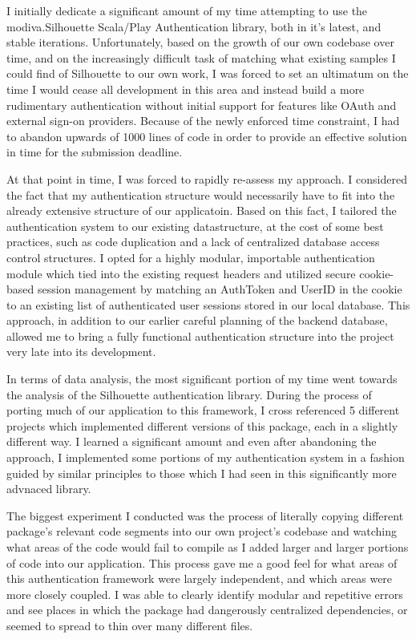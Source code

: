 \documentclass{article}
\begin{document}
    I initially dedicate a significant amount of my time attempting to use the modiva.Silhouette Scala/Play Authentication library, both in it's latest, and stable iterations. Unfortunately, based on the growth of our own codebase over time, and on the increasingly difficult task of matching what existing samples I could find of Silhouette to our own work, I was forced to set an ultimatum on the time I would cease all development in this area and instead build a more rudimentary authentication without initial support for features like OAuth and external sign-on providers. Because of the newly enforced time constraint, I had to abandon upwards of 1000 lines of code in order to provide an effective solution in time for the submission deadline.

    At that point in time, I was forced to rapidly re-assess my approach. I considered the fact that my authentication structure would necessarily have to fit into the already extensive structure of our applicatoin. Based on this fact, I tailored the authentication system to our existing datastructure, at the cost of some best practices, such as code duplication and a lack of centralized database access control structures. I opted for a highly modular, importable authentication module which tied into the existing request headers and utilized secure cookie-based session management by matching an AuthToken and UserID in the cookie to an existing list of authenticated user sessions stored in our local database. This approach, in addition to our earlier careful planning of the backend database, allowed me to bring a fully functional authentication structure into the project very late into its development.
    
    In terms of data analysis, the most significant portion of my time went towards the analysis of the Silhouette authentication library. During the process of porting much of our application to this framework, I cross referenced 5 different projects which implemented different versions of this package, each in a slightly different way. I learned a significant amount and even after abandoning the approach, I implemented some portions of my authentication system in a fashion guided by similar principles to those which I had seen in this significantly more advnaced library.
    
    The biggest experiment I conducted was the process of literally copying different package's relevant code segments into our own project's codebase and watching what areas of the code would fail to compile as I added larger and larger portions of code into our application. This process gave me a good feel for what areas of this authentication framework were largely independent, and which areas were more closely coupled. I was able to clearly identify modular and repetitive errors and see places in which the package had dangerously centralized dependencies, or seemed to spread to thin over many different files.
    
\end{document}
